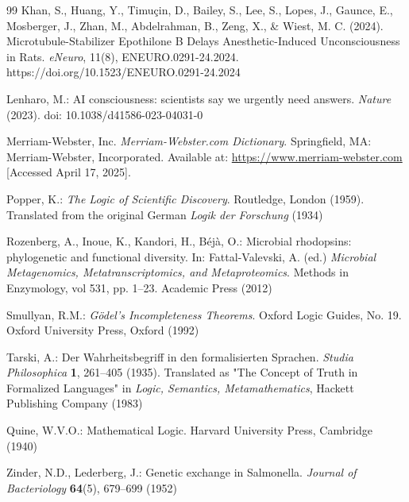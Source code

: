 \documentclass[runningheads]{llncs}
\begin{document}
\begin{thebibliography}{99}
Khan, S., Huang, Y., Timuçin, D., Bailey, S., Lee, S., Lopes, J., Gaunce, E., Mosberger, J., Zhan, M., Abdelrahman, B., Zeng, X., \& Wiest, M. C. (2024). Microtubule-Stabilizer Epothilone B Delays Anesthetic-Induced Unconsciousness in Rats. \textit{eNeuro}, 11(8), ENEURO.0291-24.2024. https://doi.org/10.1523/ENEURO.0291-24.2024

Lenharo, M.: AI consciousness: scientists say we urgently need answers. \textit{Nature} (2023). doi: 10.1038/d41586-023-04031-0

Merriam-Webster, Inc. \emph{Merriam-Webster.com Dictionary}. Springfield, MA: Merriam-Webster, Incorporated. Available at: \url{https://www.merriam-webster.com} [Accessed April 17, 2025].



Popper, K.: \textit{The Logic of Scientific Discovery}. Routledge, London (1959). Translated from the original German \textit{Logik der Forschung} (1934)

Rozenberg, A., Inoue, K., Kandori, H., Béjà, O.: Microbial rhodopsins: phylogenetic and functional diversity. In: Fattal-Valevski, A. (ed.) \textit{Microbial Metagenomics, Metatranscriptomics, and Metaproteomics}. Methods in Enzymology, vol 531, pp. 1--23. Academic Press (2012)


Smullyan, R.M.: \textit{Gödel's Incompleteness Theorems}. Oxford Logic Guides, No. 19. Oxford University Press, Oxford (1992)

Tarski, A.: Der Wahrheitsbegriff in den formalisierten Sprachen. \textit{Studia Philosophica} \textbf{1}, 261--405 (1935). Translated as "The Concept of Truth in Formalized Languages" in \textit{Logic, Semantics, Metamathematics}, Hackett Publishing Company (1983)

Quine, W.V.O.: Mathematical Logic. Harvard University Press, Cambridge (1940)


Zinder, N.D., Lederberg, J.: Genetic exchange in Salmonella. \textit{Journal of Bacteriology} \textbf{64}(5), 679--699 (1952)
	
\end{thebibliography}
\end{document}
